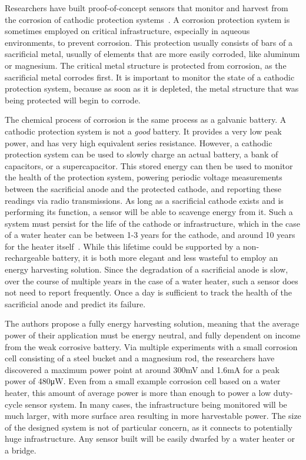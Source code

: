Researchers have built proof-of-concept sensors that monitor and harvest from the corrosion of cathodic protection systems~\cite{jagtap2021repurposing}.
A corrosion protection system is sometimes employed on critical infrastructure, especially in aqueous environments, to prevent corrosion.
This protection usually consists of bars of a sacrificial metal, usually of elements that are more easily corroded, like aluminum or magnesium. 
The critical metal structure is protected from corrosion, as the sacrificial metal corrodes first.
It is important to monitor the state of a cathodic protection system, because as soon as it is depleted, the metal structure that was being protected will begin to corrode.

The chemical process of corrosion is the same process as a galvanic battery. 
A cathodic protection system is not a \textit{good} battery.
It provides a very low peak power, and has very high equivalent series resistance.
However, a cathodic protection system can be used to slowly charge an actual battery, a bank of capacitors, or a supercapacitor. 
This stored energy can then be used to monitor the health of the protection system, powering periodic voltage measurements between the sacrificial anode and the protected cathode, and reporting these readings via radio transmissions. 
As long as a sacrificial cathode exists and is performing its function, a sensor will be able to scavenge energy from it.
Such a system must persist for the life of the cathode or infrastructure, which in the case of a water heater can be between 1-3 years for the cathode, and around 10 years for the heater itself~\cite{jagtap2021repurposing}.
While this lifetime could be supported by a non-rechargeable battery, it is both more elegant and less wasteful to employ an energy harvesting solution.
Since the degradation of a sacrificial anode is slow, over the course of multiple years in the case of a water heater, such a sensor does not need to report frequently.
Once a day is sufficient to track the health of the sacrificial anode and predict its failure.

The authors propose a fully energy harvesting solution, meaning that the average power of their application must be energy neutral, and fully dependent on income from the weak corrosive battery.
Via multiple experiments with a small corrosion cell consisting of a steel bucket and a magnesium rod, the researchers have discovered a maximum power point at around 300\si{\milli\volt} and 1.6\si{\milli\ampere} for a peak power of 480\si{\micro\watt}.
Even from a small example corrosion cell based on a water heater, this amount of average power is more than enough to power a low duty-cycle sensor system.
In many cases, the infrastructure being monitored will be much larger, with more surface area resulting in more harvestable power.
The size of the designed system is not of particular concern, as it connects to potentially huge infrastructure.
Any sensor built will be easily dwarfed by a water heater or a bridge.

